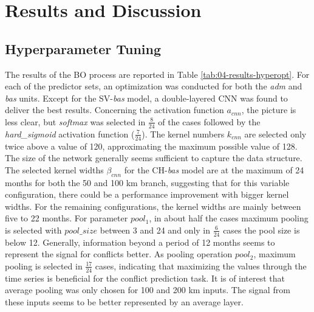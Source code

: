 \documentclass[a4paper,11pt]{article}
\begin{document}
\newpage

\hypertarget{results-and-discussion}{%
\section{Results and Discussion}\label{results-and-discussion}}

\setcounter{page}{48}

\hypertarget{hyperparameter-tuning}{%
\subsection{Hyperparameter Tuning}\label{hyperparameter-tuning}}

The results of the BO process are reported in Table \ref{tab:04-results-hyperopt}.
For each of the predictor sets, an optimization was conducted for both the \emph{adm}
and \emph{bas} units. Except for the SV-\emph{bas} model, a double-layered CNN was found
to deliver the best results. Concerning the activation function \(a_{cnn}\), the
picture is less clear, but \emph{softmax} was selected in \(\frac{8}{24}\) of the
cases followed by the \emph{hard\_sigmoid} activation function (\(\frac{7}{24}\)). The
kernel numbers \(k_{cnn}\) are selected only twice above a value of 120, approximating
the maximum possible value of 128. The size of the network generally seems sufficient
to capture the data structure.
The selected kernel widths \(\beta_{cnn}\) for the CH-\emph{bas} model
are at the maximum of 24 months for both the 50 and 100 km branch, suggesting
that for this variable configuration, there could be a performance improvement
with bigger kernel widths. For the remaining configurations, the kernel
widths are mainly between five to 22 months. For parameter \(pool_1\), in about
half the cases maximum pooling is selected with \(pool\_size\) between 3 and 24
and only in \(\frac{6}{24}\) cases the pool size is below 12.
Generally, information beyond a period of 12 months seems to represent the signal
for conflicts better. As pooling operation \(pool_2\), maximum pooling is selected in \(\frac{17}{24}\)
cases, indicating that maximizing the values through the time series is beneficial
for the conflict prediction task. It is of interest that average pooling was only
chosen for 100 and 200 km inputs. The signal from these inputs seems to be better
represented by an average layer.
\end{document}
